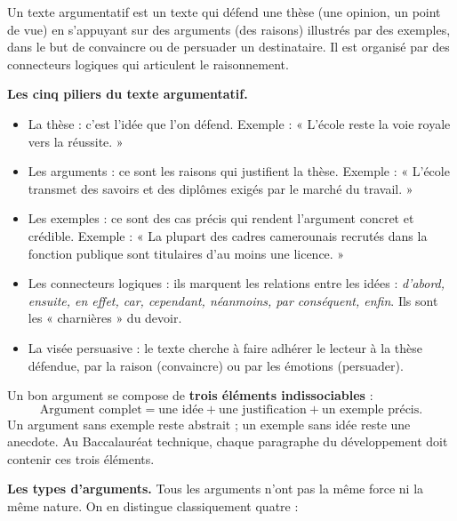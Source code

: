 \documentclass[11pt]{article}
\newcommand{\cle}[1]{{\popxbold\color{popdark}#1}}
\begin{document}
\begin{definition}
Un \cle{texte argumentatif} est un texte qui défend une \cle{thèse} (une opinion, un point de vue) en s'appuyant sur des \cle{arguments} (des raisons) illustrés par des \cle{exemples}, dans le but de convaincre ou de persuader un destinataire. Il est organisé par des \cle{connecteurs logiques} qui articulent le raisonnement.
\end{definition}

\textbf{Les cinq piliers du texte argumentatif.}
\begin{itemize}
\item La \cle{thèse} : c'est l'idée que l'on défend. Exemple : « L'école reste la voie royale vers la réussite. »
\item Les \cle{arguments} : ce sont les raisons qui justifient la thèse. Exemple : « L'école transmet des savoirs et des diplômes exigés par le marché du travail. »
\item Les \cle{exemples} : ce sont des cas précis qui rendent l'argument concret et crédible. Exemple : « La plupart des cadres camerounais recrutés dans la fonction publique sont titulaires d'au moins une licence. »
\item Les \cle{connecteurs logiques} : ils marquent les relations entre les idées : \emph{d'abord, ensuite, en effet, car, cependant, néanmoins, par conséquent, enfin}. Ils sont les « charnières » du devoir.
\item La \cle{visée persuasive} : le texte cherche à faire adhérer le lecteur à la thèse défendue, par la raison (convaincre) ou par les émotions (persuader).
\end{itemize}

\begin{propriete}
Un bon argument se compose de \textbf{trois éléments indissociables} :
\[
\text{Argument complet} = \text{une idée} + \text{une justification} + \text{un exemple précis}.
\]
Un argument sans exemple reste abstrait ; un exemple sans idée reste une anecdote. Au Baccalauréat technique, chaque paragraphe du développement doit contenir ces trois éléments.
\end{propriete}

\textbf{Les types d'arguments.} Tous les arguments n'ont pas la même force ni la même nature. On en distingue classiquement quatre :
\end{document}
